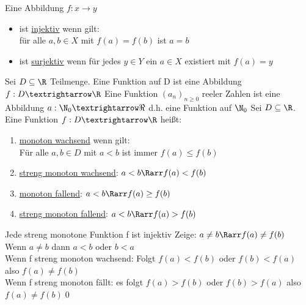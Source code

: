 %
\wdh
Eine Abbildung $f:x→y$\\
\begin{itemize}
\item{ist \underline{injektiv} wenn gilt:\\
für alle $a,b\in X$ mit $f(a)=f(b)$ ist $a=b$}
\item{ist \underline{surjektiv} wenn für jedes $y\in Y$ ein $a\in X$ existiert mit $f(a)=y$}
\end{itemize}
Sei $D\subseteq\R$ Teilmenge. Eine Funktion auf D ist eine Abbildung $f:D→\R$
%
\bem
Eine Funktion $(a_n)_{n\geq 0}$ reeler Zahlen ist eine Abbildung $a:\N_0→\Re$ d.h. eine Funktion auf $\N_0$
%
Sei $D\subseteq\R$. Eine Funktion  $f:D→\R$ heißt:
\begin{enumerate}
\item{\underline{monoton wachsend} wenn gilt:\\
Für alle $a,b\in D$ mit $a<b$ ist immer $f(a)\leq f(b)$}
\item{\underline{streng monoton wachsend}: $a<b\Rarr f(a)<f(b)$}
\item{\underline{monoton fallend}: $a<b\Rarr f(a)\geq f(b)$}
\item{\underline{streng monoton fallend}: $a<b\Rarr f(a)> f(b)$}
\end{enumerate}
%
\bem
Jede streng monotone Funktion f ist injektiv
%
\bew
Zeige: $a\neq b\Rarr f(a)\neq f(b)$\\
Wenn $a\neq b$ dann $a< b$ oder $b<a$\\
Wenn f streng monoton wachsend: Folgt $f(a)< f(b)$ oder $f(b)< f(a)$ also $f(a)\neq f(b)$\\
Wenn f streng monoton fällt: es folgt $f(a)> f(b)$ oder $f(b)> f(a)$ also $f(a)\neq f(b)$\qed
%
